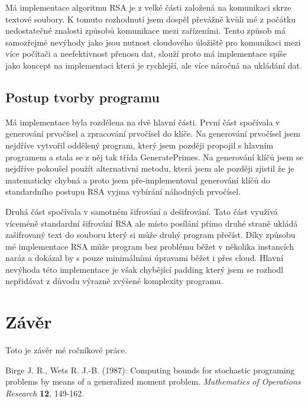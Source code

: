 \documentclass[12pt,a4paper]{report}
\begin{document}
Má implementace algoritmu RSA je z velké části založená na komunikaci skrze textové soubory. K tomuto rozhodnutí jsem dospěl převážně kvůli mé z počátku nedostatečné znalosti způsobů komunikace mezi zařízeními. Tento způsob má samozřejmé nevýhody jako jsou nutnost cloudového úložiště pro komunikaci mezi více počítači a neefektivnost přenosu dat, slouží proto má implementace spíše jako koncept na implementaci která je rychlejší, ale více náročná na ukládání dat.

\section{Postup tvorby programu}
Má implementace byla rozdělena na dvě hlavní části. První část spočívala v generování prvočísel a zpracování prvočísel do klíče. Na generování prvočísel jsem nejdříve vytvořil oddělený program, který jsem později propojil s hlavním programem a stala se z něj tak třída GeneratePrimes. Na generování klíčů jsem se nejdříve pokoušel použít alternativní metodu, která jsem ale později zjistil že je matematicky chybná a proto jsem pře-implementoval generování klíčů do standardního postupu RSA vyjma vybírání náhodných prvočísel. 

Druhá část spočívala v samotném šifrování a dešifrování. Tato část využívá víceméně standardní šifrování RSA ale místo posílání přímo druhé straně ukládá zašifrovaný text do souboru který si může druhý program přečíst. Díky způsobu mé implementace RSA může program bez problému běžet v několika instancích naráz a dokázal by s pouze minimálními úpravami běžet i přes cloud. Hlavní nevýhoda této implementace je však chybějící padding který jsem se rozhodl nepřidávat z důvodu výrazně zvýšené komplexity programu. 



\chapter{Závěr}
Toto je závěr mé ročníkové práce.

\begin{thebibliography}{99}

Birge J. R., Wets R. J.-B. (1987): Computing bounds for stochastic programing problems by means of a generalized moment problem. \textit{Mathematics of Operations Research} \textbf{12}, 149-162.
\end{thebibliography}


\openright
\end{document}
